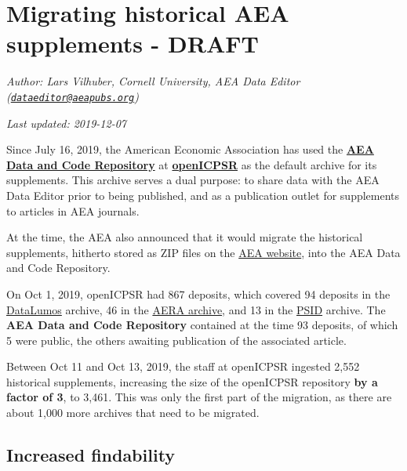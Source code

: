 \documentclass[]{article}
\title{}
\author{}
\date{}
\begin{document}
\hypertarget{migrating-historical-aea-supplements---draft}{%
\section{Migrating historical AEA supplements -
DRAFT}\label{migrating-historical-aea-supplements---draft}}

\emph{Author: Lars Vilhuber, Cornell University, AEA Data Editor
(\href{mailto:dataeditor@aeapubs.org}{\nolinkurl{dataeditor@aeapubs.org}})}

\emph{Last updated: 2019-12-07}

Since July 16, 2019, the American Economic Association has used the
\textbf{\href{https://www.openicpsr.org/openicpsr/aea}{AEA Data and Code
Repository}} at
\textbf{\href{https://www.openicpsr.org/openicpsr/}{openICPSR}} as the
default archive for its supplements. This archive serves a dual purpose:
to share data with the AEA Data Editor prior to being published, and as
a publication outlet for supplements to articles in AEA journals.

At the time, the AEA also announced that it would migrate the historical
supplements, hitherto stored as ZIP files on the
\href{https://www.aeaweb.org/journals}{AEA website}, into the AEA Data
and Code Repository.

On Oct 1, 2019, openICPSR had 867 deposits, which covered 94 deposits in
the \href{https://www.datalumos.org/datalumos/search/studies}{DataLumos}
archive, 46 in the
\href{https://www.openicpsr.org/openicpsr/search/aerajournals/studies}{AERA
archive}, and 13 in the
\href{https://www.openicpsr.org/openicpsr/search/psid/studies}{PSID}
archive. The \textbf{AEA Data and Code Repository} contained at the time
93 deposits, of which 5 were public, the others awaiting publication of
the associated article.

Between Oct 11 and Oct 13, 2019, the staff at openICPSR ingested 2,552
historical supplements, increasing the size of the openICPSR repository
\textbf{by a factor of 3}, to 3,461. This was only the first part of the
migration, as there are about 1,000 more archives that need to be
migrated.

\hypertarget{increased-findability}{%
\subsection{Increased findability}\label{increased-findability}}
\end{document}
